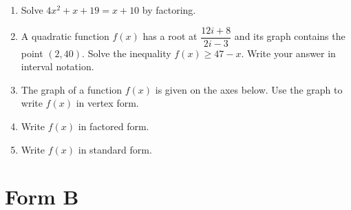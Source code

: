 \begin{enumerate}[leftmargin=*, label=\textbf{\arabic*.}]
  \item Solve $4x^2 + x + 19 = x + 10$ by factoring. 
  \vgappp

  \item A quadratic function $f(x)$ has a root at $\dfrac{12i+8}{2i-3}$ and its graph contains the point $(2,40)$. Solve the inequality $f(x) \geq 47 - x$. Write your answer in interval notation. 
  \vgappp

  \item The graph of a function $f(x)$ is given on the axes below. Use the graph to write $f(x)$ in vertex form. 

  \begin{center}
  \end{center}
  \vgap

  \item Write $f(x)$ in factored form. 
  \vgap

  \item Write $f(x)$ in standard form. 
  \vgapp

\end{enumerate}

\clearpage
\section*{Form B}

